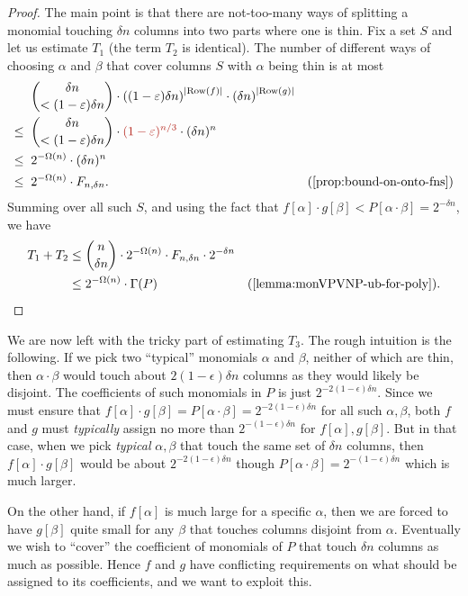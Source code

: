 \begin{proof}
  The main point is that there are not-too-many ways of splitting a monomial touching $\delta n$ columns into two parts where one is thin.
  Fix a set $S$ and let us estimate $T_1$ (the term $T_2$ is identical).
  The number of different ways of choosing $\alpha$ and $\beta$ that cover columns $S$ with $\alpha$ being thin is at most
  \begin{align*}
    & \;\; \binom{\delta n}{< (1 - \epsilon)\delta n} \cdot \inparen{(1- \epsilon)\delta n}^{\abs{\Row(f)}} \cdot \inparen{\delta n}^{\abs{\Row(g)}}\\
    \leq & \;\; \binom{\delta n}{< (1 - \epsilon)\delta n} \cdot \textcolor{BrickRed}{(1 - \epsilon)^{n/3}} \cdot (\delta n)^n \\
    \leq & \;\; 2^{-\Omega(n)} \cdot (\delta n)^n\\
    \leq & \;\; 2^{-\Omega(n)} \cdot F_{n,\delta n}. &\text{(\autoref{prop:bound-on-onto-fns})}
  \end{align*}
  Summing over all such $S$, and using the fact that $f[\alpha] \cdot g[\beta] < P[\alpha \cdot \beta] = 2^{-\delta n}$, we have
  \begin{align*}
    T_1 + T_2 & \leq \binom{n}{\delta n} \cdot 2^{- \Omega(n)} \cdot F_{n,\delta n} \cdot 2^{-\delta n} \\
    & \leq 2^{-\Omega(n)} \cdot \Gamma(P) & \text{(\autoref{lemma:monVPVNP-ub-for-poly})}.
  \end{align*}
\end{proof}

\noindent
We are now left with the tricky part of estimating $T_3$.
The rough intuition is the following.
If we pick two ``typical'' monomials $\alpha$ and $\beta$, neither of which are thin, then $\alpha \cdot \beta$ would touch about $2(1-\epsilon)\delta n$ columns as they would likely be disjoint.
The coefficients of such monomials in $P$ is just $2^{-2(1-\epsilon)\delta n}$.
Since we must ensure that $f[\alpha] \cdot g[\beta] = P[\alpha\cdot \beta] = 2^{-2(1-\epsilon)\delta n}$ for all such $\alpha,\beta$, both $f$ and $g$ must \emph{typically} assign no more than $2^{-(1-\epsilon)\delta n}$ for $f[\alpha], g[\beta]$. But in that case, when we pick \emph{typical} $\alpha,\beta$ that touch the same set of $\delta n$ columns, then $f[\alpha] \cdot g[\beta]$ would be about $2^{-2(1-\epsilon)\delta n}$ though $P[\alpha \cdot \beta] = 2^{-(1-\epsilon)\delta n}$ which is much larger.

On the other hand, if $f[\alpha]$ is much large for a specific $\alpha$, then we are forced to have $g[\beta]$ quite small for any $\beta$ that touches columns disjoint from $\alpha$. Eventually we wish to ``cover'' the coefficient of monomials of $P$ that touch $\delta n$ columns as much as possible.
Hence $f$ and $g$ have conflicting requirements on what should be assigned to its coefficients, and we want to exploit this.

